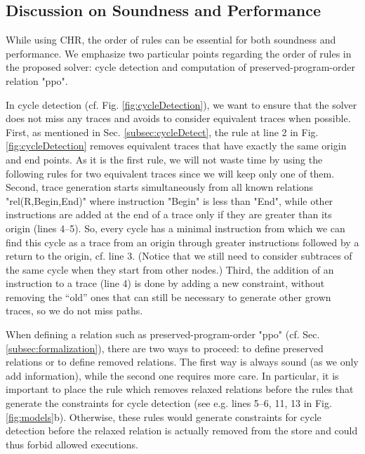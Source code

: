 \subsection{Discussion on Soundness and Performance}
\label{subsec:discuss}
While using CHR, the order of rules
can be essential for both soundness and performance. 
We emphasize two particular points regarding the order of rules in the proposed solver:
cycle detection and computation of preserved-program-order relation "ppo".

In cycle detection (cf. Fig. \ref{fig:cycleDetection}), we want to ensure that the solver does not 
miss any traces and avoids to consider equivalent traces when possible.
First, as mentioned in Sec. \ref{subsec:cycleDetect}, the rule
at line 2 in Fig. \ref{fig:cycleDetection} removes equivalent traces 
that have exactly the same origin and end points. As it is the first rule, 
we will not waste time by using the following rules for two equivalent traces 
since we will keep only one of them. 
Second, trace generation starts simultaneously from all known
relations "rel(R,Begin,End)" where instruction "Begin" is less than "End", while  
other instructions are added at the end of a trace only if they are greater than its origin (lines 4--5).
So, every cycle has a minimal instruction from which we can find this cycle
as a trace from an origin through greater instructions followed by a return to 
the origin, cf. line 3. (Notice that we 
still need to consider subtraces of the same cycle when they start from other nodes.)
Third, the addition of an
instruction to a trace (line 4) is done by adding a new constraint, 
without removing the ``old'' ones that can still be necessary to 
generate other grown traces, so we do not miss paths.


When defining a relation such as preserved-program-order "ppo" (cf. Sec. \ref{subsec:formalization}), there are
two ways to proceed: to define preserved relations or to define  removed relations. The 
first way is always sound (as we only add information), while the second one requires
more care. In particular, it is important to place the rule which
removes relaxed relations before the rules that generate the constraints for
cycle detection (see e.g. lines 5--6, 11, 13 in Fig. \ref{fig:models}b). 
Otherwise, these rules would generate constraints for cycle 
detection before the relaxed relation is actually removed from the store 
and could thus forbid allowed executions.






